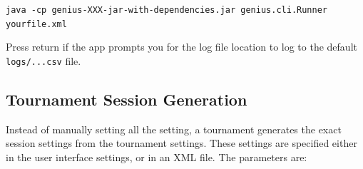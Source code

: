 \documentclass[]{article}
\begin{document}
\vspace{0.5cm}
\verb|java -cp genius-XXX-jar-with-dependencies.jar genius.cli.Runner yourfile.xml|
\vspace{0.5cm}

Press return if the app prompts you for the log file location to log to  the default \verb|logs/...csv| file.

\subsection{Tournament Session Generation}\label{sec:sessiongeneration}
Instead of manually setting all the setting, a tournament generates the exact session settings from the tournament settings. These
settings are specified either in the user interface settings, or in an XML file. The parameters are:
\end{document}
